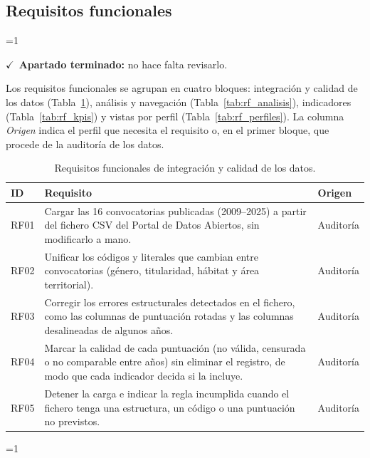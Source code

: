 \documentclass[12pt, a4paper, oneside]{report}
\newcommand{\mostrarterminados}{1}
\newenvironment{revisado}
  {\ifnum\mostrarterminados=1\relax\begin{cajarevisada}\noindent\colorbox{verdeterminado}{\parbox{\dimexpr\linewidth-2\fboxsep\relax}{\small$\checkmark$\ \textbf{Apartado terminado:} no hace falta revisarlo.}}\par\medskip\fi}
  {\ifnum\mostrarterminados=1\relax\end{cajarevisada}\fi}
\begin{document}
\subsection{Requisitos funcionales}
\begin{revisado}
Los requisitos funcionales se agrupan en cuatro bloques: integración y calidad de los datos (Tabla~\ref{tab:rf_datos}), análisis y navegación (Tabla~\ref{tab:rf_analisis}), indicadores (Tabla~\ref{tab:rf_kpis}) y vistas por perfil (Tabla~\ref{tab:rf_perfiles}). La columna \textit{Origen} indica el perfil que necesita el requisito o, en el primer bloque, que procede de la auditoría de los datos.

\begin{table}[H]
\centering
\small
\renewcommand{\arraystretch}{1.1}
\begin{tabularx}{\textwidth}{@{} p{1.2cm} X p{2.2cm} @{}}
\toprule
\textbf{ID} & \textbf{Requisito} & \textbf{Origen} \\ \midrule
RF01 & Cargar las 16 convocatorias publicadas (2009--2025) a partir del fichero CSV del Portal de Datos Abiertos, sin modificarlo a mano. & Auditoría \\ \addlinespace
RF02 & Unificar los códigos y literales que cambian entre convocatorias (género, titularidad, hábitat y área territorial). & Auditoría \\ \addlinespace
RF03 & Corregir los errores estructurales detectados en el fichero, como las columnas de puntuación rotadas y las columnas desalineadas de algunos años. & Auditoría \\ \addlinespace
RF04 & Marcar la calidad de cada puntuación (no válida, censurada o no comparable entre años) sin eliminar el registro, de modo que cada indicador decida si la incluye. & Auditoría \\ \addlinespace
RF05 & Detener la carga e indicar la regla incumplida cuando el fichero tenga una estructura, un código o una puntuación no previstos. & Auditoría \\ \bottomrule
\end{tabularx}
\caption{Requisitos funcionales de integración y calidad de los datos.}
\label{tab:rf_datos}
\end{table}


\end{revisado}
\end{document}
